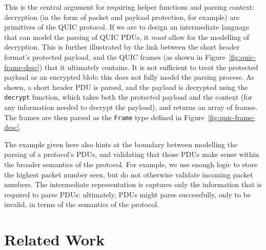 \documentclass[10pt,sigconf]{acmart}
\begin{document}
This is the central argument for requiring helper functions and parsing context: decryption (in
the form of packet and payload protection, for example) are primitives of the QUIC
protocol. If we are to design an intermediate language that can model the parsing of QUIC
PDUs, it \emph{must} allow for the modelling of decryption. This is further illustrated
by the link between the short header format's protected payload, and the QUIC frames (as
shown in Figure~\ref{fig:quic-frame-desc}) that it ultimately contains. It is not sufficient
to treat the protected payload as an encrypted blob: this does not fully model the parsing
process. As shown, a short header PDU is parsed, and the payload is decrypted using the
\texttt{decrypt} function, which takes both the protected payload and the context (for any
information needed to decrypt the payload), and returns an array of frames. The frames are
then parsed as the \texttt{Frame} type defined in Figure~\ref{fig:quic-frame-desc}.

The example given here also hints at the boundary between modelling the parsing of a 
protocol's PDUs, and validating that those PDUs make sense within the broader semantics 
of the protocol. For example, we use enough logic to store the highest packet number seen,
but do not otherwise validate incoming packet numbers. The intermediate representation is
captures only the information that is required to parse PDUs: ultimately, PDUs
might parse successfully, only to be invalid, in terms of the semantics of the protocol.

\section{Related Work}
\label{sec:related}

%
% 
\end{document}
